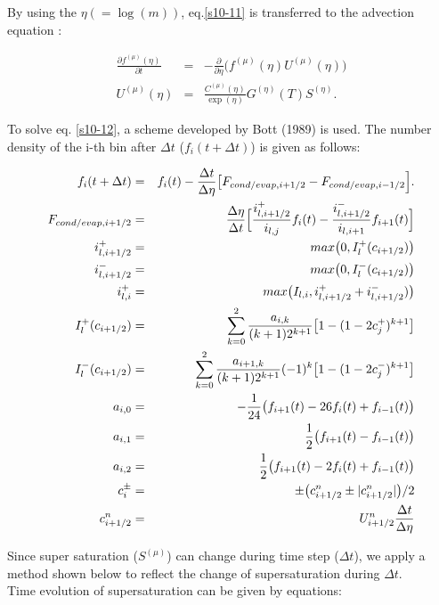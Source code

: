 By using the $\eta(=\log(m))$, eq.\ref{s10-11} is transferred to the advection equation :

\begin{eqnarray}
\frac{\partial f^{(\mu)}(\eta)}{\partial t}&=&-\frac{\partial}{\partial \eta}\bigl ( f^{(\mu)}(\eta)U^{(\mu)}(\eta)\bigr)\label{s10-12}\\
U^{(\mu)}(\eta)&=&\frac{C^{(\mu)}(\eta)}{\exp (\eta)}G^{(\eta)}(T)S^{(\eta)}.\nonumber
\end{eqnarray}

To solve eq. \ref{s10-12}, a scheme developed by Bott (1989)\cite{bott_1989} is used. The number density of the i-th bin after $\Delta t$ ($f_{i}(t+\Delta t)$) is given as follows:

\begin{eqnarray}
f_{i}(t+\Delta t)&=&f_{i}(t)-\frac{\Delta t}{\Delta \eta}\bigl [F_{cond/evap,i+1/2}-F_{cond/evap,i-1/2}\Bigr ].\nonumber\\
F_{cond/evap,i+1/2}&=&\frac{\Delta \eta}{\Delta t}\Bigl[ \frac{i^{+}_{l,i+1/2}}{i_{l,j}}f_{i}(t)-\frac{i^{-}_{l,i+1/2}}{i_{l,i+1}}f_{i+1}(t)\Bigr ]\nonumber\\
i^{+}_{l,i+1/2}&=&max\bigl(0,I^{+}_{l}(c_{i+1/2})\bigr)\nonumber\\
i^{-}_{l,i+1/2}&=&max\bigl(0,I^{-}_{l}(c_{i+1/2})\bigr)\nonumber\\
i^{+}_{l,i}&=&max\bigl(I_{l,i},i^{+}_{l,i+1/2}+i^{-}_{l,i+1/2})\bigr)\nonumber\\
I^{+}_{l}(c_{i+1/2})&=&\sum_{k=0}^{2}\frac{a_{i,k}}{(k+1)2^{k+1}}\bigl[1-(1-2c^{+}_{j})^{k+1}\bigr]\nonumber\\
I^{-}_{l}(c_{i+1/2})&=&\sum_{k=0}^{2}\frac{a_{i+1,k}}{(k+1)2^{k+1}}(-1)^{k}\bigl[1-(1-2c^{-}_{j})^{k+1}\bigr]\nonumber\\
a_{i,0}&=&-\frac{1}{24}\bigl( f_{i+1}(t)-26f_{i}(t)+f_{i-1}(t) \bigr)\nonumber\\
a_{i,1}&=&\frac{1}{2}\bigl( f_{i+1}(t)-f_{i-1}(t) \bigr)\nonumber\\
a_{i,2}&=&\frac{1}{2}\bigl( f_{i+1}(t)-2f_{i}(t)+f_{i-1}(t) \bigr)\nonumber\\
c_{i}^{\pm}&=&\pm\bigl( c^{n}_{i+1/2}\pm | c^{n}_{i+1/2}|\bigr )/2\nonumber\\
c^{n}_{i+1/2}&=&U^{n}_{i+1/2}\frac{\Delta t}{\Delta \eta}
\end{eqnarray}

Since super saturation ($S^{(\mu)}$) can change during time step ($\Delta t$), we apply a method shown below to reflect the change of supersaturation during $\Delta t$.\\
Time evolution of supersaturation can be given by equations:

